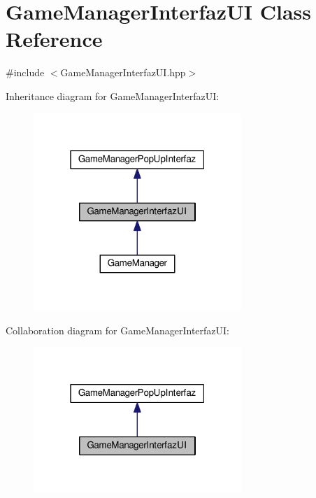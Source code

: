 \hypertarget{class_game_manager_interfaz_u_i}{}\section{Game\+Manager\+Interfaz\+UI Class Reference}
\label{class_game_manager_interfaz_u_i}


{\ttfamily \#include $<$Game\+Manager\+Interfaz\+U\+I.\+hpp$>$}



Inheritance diagram for Game\+Manager\+Interfaz\+UI\+:\nopagebreak
\begin{figure}[H]
\begin{center}
\leavevmode
\includegraphics[width=223pt]{class_game_manager_interfaz_u_i__inherit__graph}
\end{center}
\end{figure}


Collaboration diagram for Game\+Manager\+Interfaz\+UI\+:\nopagebreak
\begin{figure}[H]
\begin{center}
\leavevmode
\includegraphics[width=223pt]{class_game_manager_interfaz_u_i__coll__graph}
\end{center}
\end{figure}
